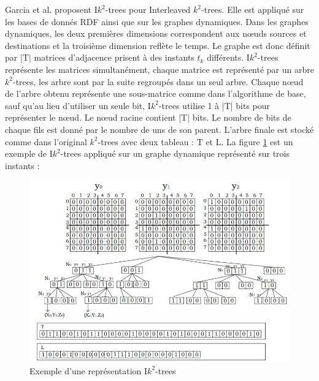 Garcia et al. \citep{garcia2014interleaved} proposent I$k^2$-trees pour Interleaved $k^2$-trees. Elle est appliqué sur les bases de donnés RDF ainsi que sur les graphes dynamiques. Dans les graphes dynamiques, les deux premières dimensions correspondent aux nœuds sources et destinations et la troisième dimension reflète le temps. Le graphe est donc définit par |T| matrices d'adjacence prisent à des instants $t_k$ différents. I$k^2$-trees représente les matrices simultanément, chaque matrice est représenté par un arbre $k^2$-trees, les arbre sont par la suite regroupés dans un seul arbre. Chaque nœud de l'arbre obtenu représente une sous-matrice comme dans l'algorithme de base, sauf qu'au lieu d'utiliser un seule bit, I$k^2$-trees utilise 1 à |T| bits pour représenter le nœud. Le nœud racine contient |T| bits. Le nombre de bits de chaque fils est donné par le nombre de uns de son parent. L'arbre finale est stocké comme dans l'original $k^2$-trees avec deux tableau : T et L.
La figure \ref{Ik2-trees} est un exemple de I$k^2$-trees appliqué sur un graphe dynamique représenté sur trois instants \citep{garcia2014interleaved} :

\begin{figure}[H]
\begin{center}
\includegraphics[height=200 pt, width=380 pt]{./ressources/image/Ik2-trees.png} 
\end{center}
\caption{Exemple d'une représentation I$k^2$-trees}
\label{Ik2-trees}
\end{figure}

